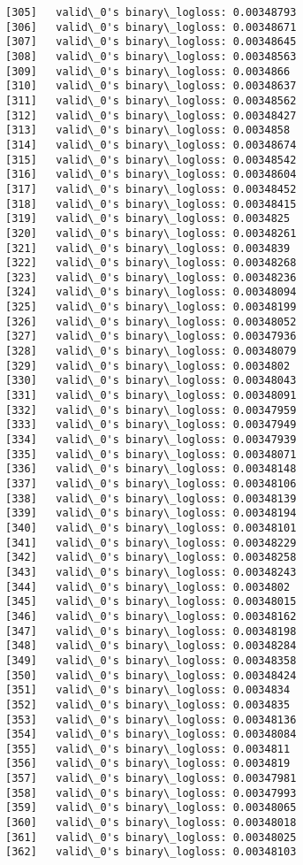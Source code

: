 \documentclass[11pt]{article}
\begin{document}
\begin{Verbatim}[commandchars=\\\{\}]
[305]	valid\_0's binary\_logloss: 0.00348793
[306]	valid\_0's binary\_logloss: 0.00348671
[307]	valid\_0's binary\_logloss: 0.00348645
[308]	valid\_0's binary\_logloss: 0.00348563
[309]	valid\_0's binary\_logloss: 0.0034866
[310]	valid\_0's binary\_logloss: 0.00348637
[311]	valid\_0's binary\_logloss: 0.00348562
[312]	valid\_0's binary\_logloss: 0.00348427
[313]	valid\_0's binary\_logloss: 0.0034858
[314]	valid\_0's binary\_logloss: 0.00348674
[315]	valid\_0's binary\_logloss: 0.00348542
[316]	valid\_0's binary\_logloss: 0.00348604
[317]	valid\_0's binary\_logloss: 0.00348452
[318]	valid\_0's binary\_logloss: 0.00348415
[319]	valid\_0's binary\_logloss: 0.0034825
[320]	valid\_0's binary\_logloss: 0.00348261
[321]	valid\_0's binary\_logloss: 0.0034839
[322]	valid\_0's binary\_logloss: 0.00348268
[323]	valid\_0's binary\_logloss: 0.00348236
[324]	valid\_0's binary\_logloss: 0.00348094
[325]	valid\_0's binary\_logloss: 0.00348199
[326]	valid\_0's binary\_logloss: 0.00348052
[327]	valid\_0's binary\_logloss: 0.00347936
[328]	valid\_0's binary\_logloss: 0.00348079
[329]	valid\_0's binary\_logloss: 0.0034802
[330]	valid\_0's binary\_logloss: 0.00348043
[331]	valid\_0's binary\_logloss: 0.00348091
[332]	valid\_0's binary\_logloss: 0.00347959
[333]	valid\_0's binary\_logloss: 0.00347949
[334]	valid\_0's binary\_logloss: 0.00347939
[335]	valid\_0's binary\_logloss: 0.00348071
[336]	valid\_0's binary\_logloss: 0.00348148
[337]	valid\_0's binary\_logloss: 0.00348106
[338]	valid\_0's binary\_logloss: 0.00348139
[339]	valid\_0's binary\_logloss: 0.00348194
[340]	valid\_0's binary\_logloss: 0.00348101
[341]	valid\_0's binary\_logloss: 0.00348229
[342]	valid\_0's binary\_logloss: 0.00348258
[343]	valid\_0's binary\_logloss: 0.00348243
[344]	valid\_0's binary\_logloss: 0.0034802
[345]	valid\_0's binary\_logloss: 0.00348015
[346]	valid\_0's binary\_logloss: 0.00348162
[347]	valid\_0's binary\_logloss: 0.00348198
[348]	valid\_0's binary\_logloss: 0.00348284
[349]	valid\_0's binary\_logloss: 0.00348358
[350]	valid\_0's binary\_logloss: 0.00348424
[351]	valid\_0's binary\_logloss: 0.0034834
[352]	valid\_0's binary\_logloss: 0.0034835
[353]	valid\_0's binary\_logloss: 0.00348136
[354]	valid\_0's binary\_logloss: 0.00348084
[355]	valid\_0's binary\_logloss: 0.0034811
[356]	valid\_0's binary\_logloss: 0.0034819
[357]	valid\_0's binary\_logloss: 0.00347981
[358]	valid\_0's binary\_logloss: 0.00347993
[359]	valid\_0's binary\_logloss: 0.00348065
[360]	valid\_0's binary\_logloss: 0.00348018
[361]	valid\_0's binary\_logloss: 0.00348025
[362]	valid\_0's binary\_logloss: 0.00348103

\end{Verbatim}
\end{document}
